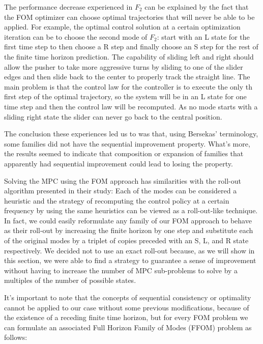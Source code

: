 \documentclass[12,twoside]{TFG-GM}
\theoremstyle{definition}
\theoremstyle{remark}
\begin{document}
The performance decrease experienced in $F_2$ can be explained by the fact that the FOM optimizer can choose optimal trajectories that will never be able to be applied. For example, the optimal control solution at a certain optimization iteration can be to choose the second mode of $F_2$: start with an L state for the first time step to then choose a R step and finally choose an S step for the rest of the finite time horizon prediction. The capability of sliding left and right should allow the pusher to take more aggressive turns by sliding to one of the slider edges and then slide back to the center to properly track the straight line. The main problem is that the control law for the controller is to execute the only th first step of the optimal trajectory, so the system will be in an L state for one time step and then the control law will be recomputed. As no mode starts with a sliding right state the slider can never go back to the central position.

The conclusion these experiences led us to was that, using Bersekas' terminology, some families did not have the sequential improvement property. What's more, the results seemed to indicate that composition or expansion of families that apparently had sequential improvement could lead to losing the property.

Solving the MPC using the FOM approach has similarities with the roll-out algorithm presented in their study: Each of the modes can be considered a heuristic and the strategy of recomputing the control policy at a certain frequency by using the same heuristics can be viewed as a roll-out-like technique. In fact, we could easily reformulate any family of our FOM approach to behave as their roll-out by increasing the finite horizon by one step and substitute each of the original modes by a triplet of copies preceded with an S, L, and R state respectively. We decided not to use an exact roll-out because, as we will show in this section, we were able to find a strategy to guarantee a sense of improvement without having to increase the number of MPC sub-problems to solve by a multiples of the number of possible states.

It's important to note that the concepts of sequential consistency or optimality cannot be applied to our case without some previous modifications, because of the existence of a receding finite time horizon, but for every FOM problem we can formulate an associated Full Horizon Family of Modes (FFOM) problem as follows:
\end{document}
